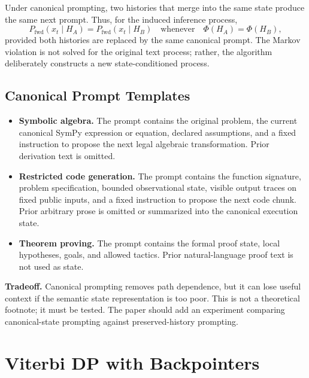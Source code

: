\documentclass[11pt,letterpaper]{article}
\newcommand{\Phifn}{\Phi}
\newcommand{\Pfwd}{P_{\mathrm{fwd}}}
\begin{document}
Under canonical prompting, two histories that merge into the same state produce the same next prompt.
Thus, for the induced inference process,
\[
  \Pfwd(x_t \mid H_A) = \Pfwd(x_t \mid H_B)
  \quad \text{whenever} \quad \Phifn(H_A) = \Phifn(H_B),
\]
provided both histories are replaced by the same canonical prompt.
The Markov violation is not solved for the original text process; rather, the algorithm deliberately
constructs a new state-conditioned process.

\subsection{Canonical Prompt Templates}

\begin{itemize}
  \item \textbf{Symbolic algebra.}
        The prompt contains the original problem, the current canonical SymPy expression or equation,
        declared assumptions, and a fixed instruction to propose the next legal algebraic transformation.
        Prior derivation text is omitted.
  \item \textbf{Restricted code generation.}
        The prompt contains the function signature, problem specification, bounded observational state,
        visible output traces on fixed public inputs, and a fixed instruction to propose the next code
        chunk.
        Prior arbitrary prose is omitted or summarized into the canonical execution state.
  \item \textbf{Theorem proving.}
        The prompt contains the formal proof state, local hypotheses, goals, and allowed tactics.
        Prior natural-language proof text is not used as state.
\end{itemize}

\begin{callout}
\textbf{Tradeoff.}
Canonical prompting removes path dependence, but it can lose useful context if the semantic state
representation is too poor.
This is not a theoretical footnote; it must be tested.
The paper should add an experiment comparing canonical-state prompting against preserved-history
prompting.
\end{callout}

\section{Viterbi DP with Backpointers}
\end{document}
